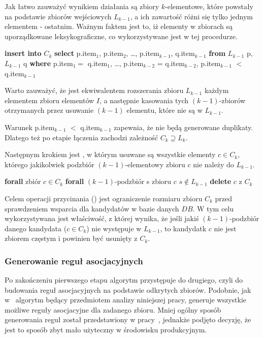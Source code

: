 Jak łatwo zauważyć wynikiem działania  są zbiory $k$-elementowe, które powstały na podstawie zbiorów wejściowych $L_{k-1}$, a ich zawartość różni się tylko jednym elementem - ostatnim. Ważnym faktem jest to, iż elementy w zbiorach są uporządkowane leksykograficzne, co wykorzystywane jest w tej procedurze.

\begin{codebox}
	\li \textbf{insert into} $C_k$
	\li \textbf{select} p.item$_1$, p.item$_2$, \dots, p.item$_{k-1}$, q.item$_{k-1}$
	\li \textbf{from} $L_{k-1}$ p, $L_{k-1}$ q
	\li \textbf{where} p.item$_1 = $ q.item$_1$, \dots, p.item$_{k-2}$ = q.item$_{k-2}$, p.item$_{k-1}$ $<$ q.item$_{k-1}$
\end{codebox}

Warto zauważyć, że  jest ekwiwalentem rozszerania zbioru $L_{k-1}$ każdym elementem zbioru elementów $I$, a następnie kasowania tych $(k-1)$-zbiorów otrzymanych przez usuwanie $(k-1)$ elementu, które nie są w $L_{k-1}$. 

Warunek p.item$_{k-1}$ $<$ q.item$_{k-1}$ zapewnia, że nie będą generowane duplikaty. Dlatego też po etapie łączenia zachodzi zależność $C_k \supseteq L_k$.

Następnym krokiem jest , w którym usuwane są wszystkie elementy $c \in C_k$, którego jakikolwiek podzbiór $(k-1)$-elementowy zbioru $c$ nie należy do $L_{k-1}$.

\begin{codebox}
		\li \textbf{forall} zbiór $c \in C_k$ 
		\li \Do
			\li \textbf{forall} $(k-1)$-podzbiór s zbioru $c$
					\li \Do 
						\li \If $s \notin L_{k-1}$
						\li \Then
							\li \textbf{delete} $c$ z $C_k$
						\End
					\End
		\End
\end{codebox}

Celem operacji przycinania () jest ograniczenie rozmiaru zbioru $C_k$ przed sprawdzeniem wsparcia dla kandydatów w bazie danych $DB$. W tym celu wykorzystywana jest właściwość, z której wynika, że jeśli jakiś $(k-1)$-podzbiór danego kandydata ($c \in C_k$) nie występuje w $L_{k-1}$, to kandydatk $c$ nie jest zbiorem częstym i powinien być usunięty z $C_k$.

\subsubsection{Generowanie reguł asocjacyjnych}
Po zakończeniu pierwszego etapu algorytm przystępuje do drugiego, czyli do budowania reguł asocjacyjnych na podstawie odkrytych zbiorów. Podobnie, jak w~\cite{Apriori:Main} algorytm będący przedmiotem analizy niniejszej pracy, generuje wszystkie możliwe reguły asocjacyjne dla zadanego zbioru. Mniej ogólny sposób generowania reguł został przedstawiony w pracy~\cite{Problem:Statement}, jednakże podjęto decyzję, że jest to sposób zbyt mało użyteczny w środowisku produkcyjnym.

